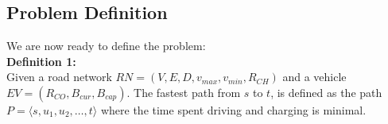 \subsection{Problem Definition} %
\label{sub:problem_definition}
We are now ready to define the problem:\\

\textbf{Definition 1:}\\

Given a road network \(RN=(V,E,D,v_{max},v_{min},R_{CH})\) and a vehicle $EV=(R_{CO},B_{cur},B_{cap})$. The fastest path from $s$ to $t$, is defined as the path $P = \langle s,u_1,u_2,\dots,t \rangle$ where the time spent driving and charging is minimal.
